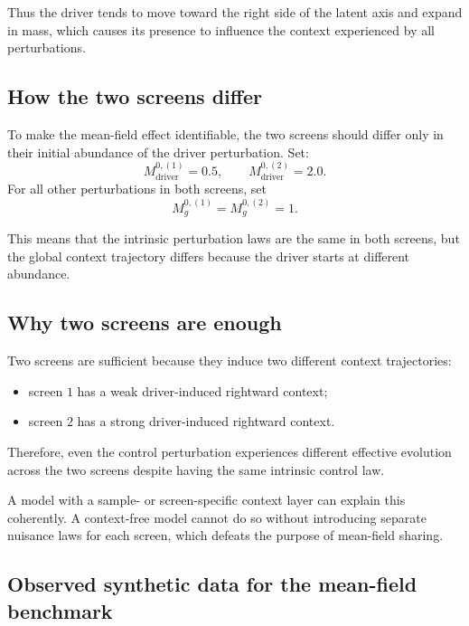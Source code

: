 \documentclass[11pt]{article}
\begin{document}
Thus the driver tends to move toward the right side of the latent axis and expand in mass, which causes its presence to influence the context experienced by all perturbations.

\subsection{How the two screens differ}

To make the mean-field effect identifiable, the two screens should differ only in their initial abundance of the driver perturbation. Set:
\begin{equation}
M_{\mathrm{driver}}^{0,(1)} = 0.5,
\qquad
M_{\mathrm{driver}}^{0,(2)} = 2.0.
\label{eq:driver_screen_difference}
\end{equation}
For all other perturbations in both screens, set
\begin{equation}
M_g^{0,(1)} = M_g^{0,(2)} = 1.
\label{eq:other_screen_masses}
\end{equation}

This means that the intrinsic perturbation laws are the same in both screens, but the global context trajectory differs because the driver starts at different abundance.

\subsection{Why two screens are enough}

Two screens are sufficient because they induce two different context trajectories:
\begin{itemize}[leftmargin=2em]
    \item screen \(1\) has a weak driver-induced rightward context;
    \item screen \(2\) has a strong driver-induced rightward context.
\end{itemize}
Therefore, even the control perturbation experiences different effective evolution across the two screens despite having the same intrinsic control law.

A model with a sample- or screen-specific context layer can explain this coherently. A context-free model cannot do so without introducing separate nuisance laws for each screen, which defeats the purpose of mean-field sharing.

\subsection{Observed synthetic data for the mean-field benchmark}
\end{document}
